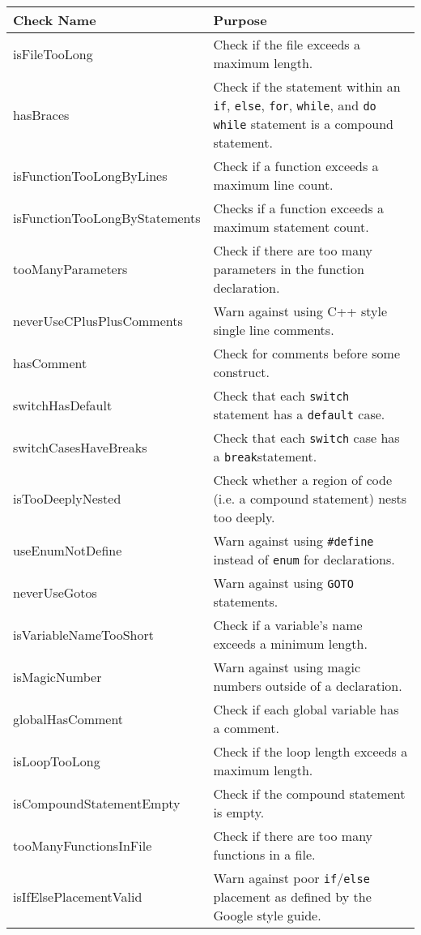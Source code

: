 \documentclass[12pt]{report}
\begin{document}
\begin{table}
\small
	\begin{center}
	\begin{tabular}{l p{9cm}}
		\toprule
		Check Name & Purpose \\
		\midrule
		isFileTooLong & Check if the file exceeds a maximum length. \\
		hasBraces & Check if the statement within an \lstinline!if!, \lstinline!else!, \lstinline!for!, \lstinline!while!, and \lstinline!do while! statement is a compound statement.\\
		isFunctionTooLongByLines & Check if a function exceeds a maximum line count. \\
		isFunctionTooLongByStatements & Checks if a function exceeds a maximum statement count. \\
		tooManyParameters & Check if there are too many parameters in the function declaration. \\
		neverUseCPlusPlusComments & Warn against using C++ style single line comments. \\
		hasComment & Check for comments before some construct. \\
		switchHasDefault & Check that each \lstinline!switch! statement has a \lstinline!default! case. \\
		switchCasesHaveBreaks & Check that each \lstinline!switch! case has a \lstinline!break!statement. \\
		isTooDeeplyNested & Check whether a region of code (i.e. a compound statement) nests too deeply. \\
		useEnumNotDefine & Warn against using \lstinline!#define! instead of \lstinline!enum! for declarations. \\
		neverUseGotos & Warn against using \lstinline!GOTO! statements. \\
		isVariableNameTooShort & Check if a variable's name exceeds a minimum length. \\
		isMagicNumber & Warn against using magic numbers outside of a declaration. \\
		globalHasComment & Check if each global variable has a comment. \\
		isLoopTooLong & Check if the loop length exceeds a maximum length. \\
		isCompoundStatementEmpty  & Check if the compound statement is empty. \\
		tooManyFunctionsInFile & Check if there are too many functions in a file. \\
		isIfElsePlacementValid & Warn against poor \lstinline!if!\slash\lstinline!else! placement as defined by the Google style guide. \\

\end{tabular}
\end{center}
\end{table}
\end{document}
